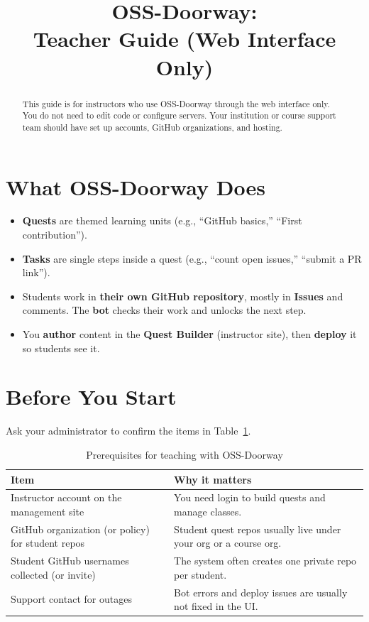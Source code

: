 \documentclass[11pt,a4paper]{article}
\title{OSS-Doorway:\\Teacher Guide (Web Interface Only)}
\author{}
\date{}
\begin{document}
\maketitle

\begin{abstract}
This guide is for instructors who use OSS-Doorway through the web interface only. You do not need to edit code or configure servers. Your institution or course support team should have set up accounts, GitHub organizations, and hosting.
\end{abstract}

\section{What OSS-Doorway Does}

\begin{itemize}[leftmargin=*]
  \item \textbf{Quests} are themed learning units (e.g., ``GitHub basics,'' ``First contribution'').
  \item \textbf{Tasks} are single steps inside a quest (e.g., ``count open issues,'' ``submit a PR link'').
  \item Students work in \textbf{their own GitHub repository}, mostly in \textbf{Issues} and comments. The \textbf{bot} checks their work and unlocks the next step.
  \item You \textbf{author} content in the \textbf{Quest Builder} (instructor site), then \textbf{deploy} it so students see it.
\end{itemize}

\section{Before You Start}

Ask your administrator to confirm the items in Table~\ref{tab:prereq}.

\begin{table}[htbp]
  \centering
  \caption{Prerequisites for teaching with OSS-Doorway}
  \label{tab:prereq}
  \begin{tabularx}{\linewidth}{@{}lX@{}}
    \toprule
    \textbf{Item} & \textbf{Why it matters} \\
    \midrule
    Instructor account on the management site &
      You need login to build quests and manage classes. \\
    GitHub organization (or policy) for student repos &
      Student quest repos usually live under your org or a course org. \\
    Student GitHub usernames collected (or invite) &
      The system often creates one private repo per student. \\
    Support contact for outages & Bot errors and deploy issues are usually not fixed in the UI. \\
    \bottomrule
  \end{tabularx}
\end{table}
\end{document}
